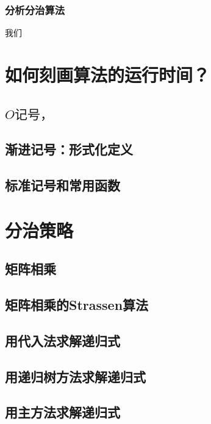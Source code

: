 \documentclass[lang=cn,newtx,10pt,scheme=chinese]{elegantbook}
\begin{document}
\subsection{分析分治算法}

我们

\chapter{如何刻画算法的运行时间？}

\section{\texorpdfstring{$O\text{记号，}$}\texorpdfstring{$\Omega\text{记号和}$}\texorpdfstring{$\Theta\text{记号}$}.}

\section{渐进记号：形式化定义}

\section{标准记号和常用函数}

\chapter{分治策略}

\section{矩阵相乘}

\section{矩阵相乘的Strassen算法}

\section{用代入法求解递归式}

\section{用递归树方法求解递归式}

\section{用主方法求解递归式}
\end{document}
